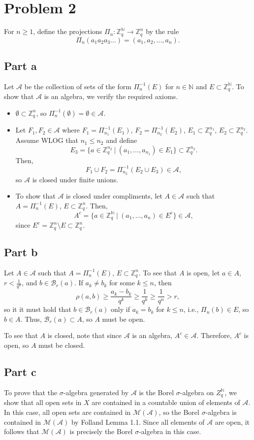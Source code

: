 \documentclass{article}
\begin{document}
\section{Problem 2}
For $n\geq1$, define the projections $\Pi_n:\mathbb{Z}^\mathbb{N}_q\to\mathbb{Z}^n_q$ by the rule
\[
\Pi_n(a_1a_2a_3\ldots)=(a_1,a_2,\ldots,a_n).
\]	
\subsection{Part a}
Let $\mathcal A$ be the collection of sets of the form $\Pi_n^{-1}(E)$ for $n\in\mathbb{N}$ and $E\subset\mathbb{Z}^\mathbb{N}_q$. To show that $\mathcal A$ is an algebra, we verify the required axioms. 
\begin{itemize}
	\item $\emptyset\subset\mathbb{Z}^n_q$, so $\Pi_n^{-1}(\emptyset)=\emptyset\in\mathcal A.$
	\item Let $F_1,F_2\in\mathcal A$ where $F_1=\Pi_{n_1}^{-1}(E_1)$, $F_2=\Pi_{n_2}^{-1}(E_2)$, $E_1\subset\mathbb{Z}^{n_1}_q$, $E_2\subset\mathbb{Z}^{n_2}_q$. Assume WLOG that $n_1\leq n_2$ and define 
	\[
	E_3=\{a\in\mathbb{Z}^{n_2}_q~|~(a_1,\ldots,a_{n_1})\in E_1\}\subset\mathbb{Z}^{n_2}_q.
	\]
	Then,
	\[
	F_1\cup F_2=\Pi_{n_2}^{-1}(E_2\cup E_3)\in\mathcal A,
	\]
	so $\mathcal A$ is closed under finite unions.
	\item To show that $\mathcal A$ is closed under compliments, let $A\in\mathcal A$ such that $A=\Pi_n^{-1}(E)$, $E\subset\mathbb{Z}^n_q$. Then,
	\[
	A^c=\{a\in\mathbb{Z}^\mathbb{N}_q~|~(a_1,\ldots,a_n)\in E^c\}\in\mathcal A,
	\]
	since $E^c=\mathbb{Z}^n_q\setminus E\subset \mathbb{Z}^n_q$.
\end{itemize}

\subsection{Part b}
Let $A\in\mathcal A$ such that $A=\Pi_n^{-1}(E)$, $E\subset\mathbb{Z}^n_q$. To see that $A$ is open, let $a\in A$, $r<\frac{1}{q^{n}}$, and $b\in\mathcal B_r(a)$.
If $a_k\neq b_k$ for some $k\leq n$, then
\[
\rho(a,b)\geq\frac{a_k-b_k}{q^k}\geq\frac{1}{q^k}\geq\frac{1}{q^{n}}>r,
\]
so it it must hold that $b\in\mathcal B_r(a)$ only if $a_k=b_k$ for $k\leq n$, i.e., $\Pi_n(b)\in E$, so $b\in A$. Thus, $\mathcal B_r(a)\subset A$, so $A$ must be open.

To see that $A$ is closed, note that since $\mathcal A$ is an algebra, $A^c\in \mathcal A$. Therefore, $A^c$ is open, so $A$ must be closed.
\subsection{Part c}
To prove that the $\sigma$-algebra generated by $\mathcal A$ is the Borel $\sigma$-algebra on $Z^{\mathbb N}_q$, we show that all open sets in $X$ are contained in a countable union of elements of $\mathcal A$. In this case, all open sets are contained in $\mathcal M(\mathcal{A})$, so the Borel $\sigma$-algebra is contained in $\mathcal M(\mathcal{A})$ by Folland Lemma 1.1. Since all elements of $\mathcal A$ are open, it follows that $\mathcal M(\mathcal{A})$ is precisely the Borel $\sigma$-algebra in this case.
\end{document}
